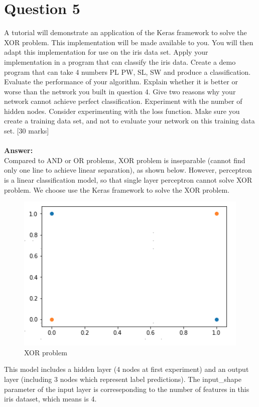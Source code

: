 \documentclass{article}
\begin{document}
\section{Question 5}
A tutorial will demonstrate an application of the Keras framework to solve the XOR problem. This implementation will be made available to you. You will then adapt this implementation for use on the iris data set.
Apply your implementation in a program that can classify the iris data. Create a demo program that can take 4 numbers PL PW, SL, SW and produce a classification. Evaluate the performance of your algorithm. Explain whether it is better or worse than the network you built in question 4. Give two reasons why your network cannot achieve perfect classification.
Experiment with the number of hidden nodes. Consider experimenting with the loss function. Make sure you create a training data set, and not to evaluate your network on this training data set.
[30 marks]\\\\
\textbf{Answer:}\\
Compared to AND or OR problems, XOR problem is inseparable (cannot find only one line to achieve linear separation), as shown below. However, perceptron is a linear classification model, so that single layer perceptron cannot solve XOR problem. We choose use the Keras framework to solve the XOR problem.
\begin{figure}[H]
\centering
\includegraphics[scale=0.4]{./img/XOR.png}
\caption{XOR problem}
\end{figure}
\noindent
This model includes a hidden layer (4 nodes at first experiment) and an output layer (including 3 nodes which represent label predictions). The input\_shape parameter of the input layer is correseponding to the number of features in this iris dataset, which means is 4.\\
\end{document}
